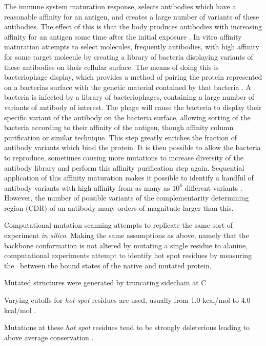 The immune system maturation response, selects antibodies which have a reasonable affinity for an antigen, and creates a large number of variants of these antibodies. 
The effect of this is that the body produces antibodies with increasing affinity for an antigen some time after the initial exposure \cite{griffiths1984somatic}.
In vitro affinity maturation attempts to select molecules, frequently antibodies, with high affinity for some target molecule by creating a library of bacteria displaying variants of these antibodies on their cellular surface.
The means of doing this is bacteriophage display, which provides a method of pairing the protein represented on a bacterias surface with the genetic material contained by that bacteria \cite{smith1985filamentous}.
A bacteria is infected by a library of bacteriophages, containing a large number of variants of antibody of interest.
The phage will cause the bacteria to display their specific variant of the antibody on the bacteria surface, allowing sorting of the bacteria according to their affinity of the antigen, though affinity column purification or similar technique.
This step greatly enriches the fraction of antibody variants which bind the protein.
It is then possible to allow the bacteria to reproduce, sometimes causing more mutations to increase diversity of the antibody library and perform this affinity purification step again.
Sequential application of this affinity maturation makes it possible to identify a handful of antibody variants with high affinity from as many as $10^{6}$ different variants \cite{gram1992vitro,hawkins1992selection}.
However, the number of possible variants of the complementarity determining region (CDR) of an antibody many orders of magnitude larger than this.

Computational mutation scanning attempts to replicate the same sort of experiment {\it in silico}.
Making the same assumptions as above, namely that the backbone conformation is not altered by mutating a single residue to alanine, computational experiments attempt to identify hot spot residues by measuring the \ddg\ between the bound states of the native and mutated protein.

Mutated structures were generated by truncating sidechain at C\subscript{$\gamma$} 
\cite{massova1999computational}

Varying cutoffs for {\it hot spot} residues are used, usually from 1.0 kcal/mol \cite{kortemme2002simple} to 4.0 kcal/mol \cite{pons1999energetic}.

Mutations at these {\it hot spot} residues tend to be strongly deleterious leading to above average conservation  \cite{hu2000conservation,lichtarge1996evolutionary}.

